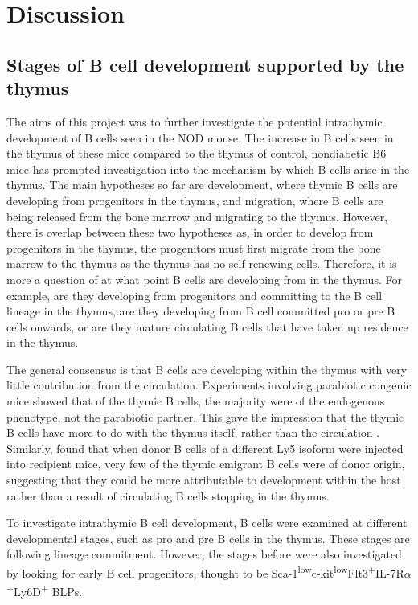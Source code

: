 
\chapter{Discussion}


\section{Stages of B cell development supported by the thymus}
The aims of this project was to further investigate the potential intrathymic development of B cells seen in the NOD mouse.
The increase in B cells seen in the thymus of these mice compared to the thymus of control, nondiabetic B6 mice has prompted investigation into the mechanism by which B cells arise in the thymus.
The main hypotheses so far are development, where thymic B cells are developing from progenitors in the thymus, and migration, where B cells are being released from the bone marrow and migrating to the thymus.
However, there is overlap between these two hypotheses as, in order to develop from progenitors in the thymus, the progenitors must first migrate from the bone marrow to the thymus as the thymus has no self-renewing cells.
Therefore, it is more a question of at what point B cells are developing from in the thymus.
For example, are they developing from progenitors and committing to the B cell lineage in the thymus, are they developing from B cell committed pro or pre B cells onwards, or are they mature circulating B cells that have taken up residence in the thymus.

The general consensus is that B cells are developing within the thymus with very little contribution from the circulation.
Experiments involving parabiotic congenic mice showed that of the thymic B cells, the majority were of the endogenous phenotype, not the parabiotic partner. 
This gave the impression that the thymic B cells have more to do with the thymus itself, rather than the circulation \citep{Perera2013}.
Similarly, \citet{Akashi2000} found that when donor B cells of a different Ly5 isoform were injected into recipient mice, very few of the thymic emigrant B cells were of donor origin, suggesting that they could be more attributable to development within the host rather than a result of circulating B cells stopping in the thymus.

To investigate intrathymic B cell development, B cells were examined at different developmental stages, such as pro and pre B cells in the thymus.
These stages are following lineage commitment.
However, the stages before were also investigated by looking for early B cell progenitors, thought to be Sca-1\textsuperscript{low}c-kit\textsuperscript{low}Flt3\textsuperscript{+}IL-7R$\alpha$\textsuperscript{+}Ly6D\textsuperscript{+} BLPs.

